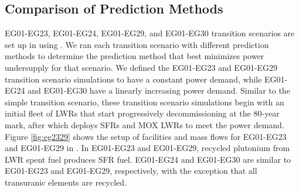 \subsection{Comparison of Prediction Methods}

EG01-EG23, EG01-EG24, EG01-EG29, and EG01-EG30 transition scenarios
are set up in \Cyclus using \deploy. 
We ran each transition scenario with different prediction 
methods to determine the prediction method that best minimizes 
power undersupply for that scenario. 
We defined the EG01-EG23 and EG01-EG29 transition scenario simulations to have a constant 
power demand, while EG01-EG24 and EG01-EG30 have a linearly increasing power demand. 
Similar to the simple transition scenario, these transition scenario 
simulations begin with an initial fleet of \glspl{LWR} 
that start progressively decommissioning at the 80-year mark, 
after which \deploy deploys \glspl{SFR} and \gls{MOX} \glspl{LWR} to meet 
the power demand. 
Figure \ref{fig:eg2329}
shows the setup of facilities and mass flows for 
EG01-EG23 and EG01-EG29 in \Cyclus. 
In EG01-EG23 and EG01-EG29, recycled plutonium from LWR spent fuel 
produces  \gls{SFR} fuel. 
EG01-EG24 and EG01-EG30 are similar to EG01-EG23 and EG01-EG29, respectively, 
with the exception that all transuranic elements are recycled.

